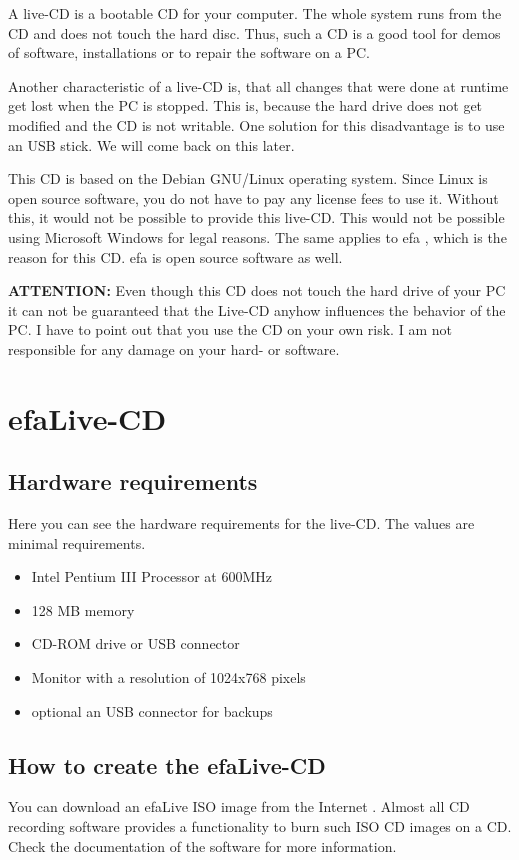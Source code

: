 \documentclass[a4paper,12pt,twoside]{article}
\begin{document}
A live-CD is a bootable CD for your computer. The whole system runs from
the CD and does not touch the hard disc. Thus, such a CD is a good tool
for demos of software, installations or to repair the software on a PC.

Another characteristic of a live-CD is, that all changes that were done
at runtime get lost when the PC is stopped. This is, because the hard
drive does not get modified and the CD is not writable. One solution
for this disadvantage is to use an USB stick. We will come back on this
later.

This CD is based on the Debian GNU/Linux \cite{DEB1} operating system.
Since Linux is open source software, you do not have to pay any license
fees to use it. Without this, it would not be possible to provide this
live-CD. This would not be possible using Microsoft Windows for legal
reasons. The same applies to efa \cite{EFA1}, which is the reason for
this CD. efa is open source software as well.

\bigskip
\textbf{ATTENTION:} Even though this CD does not touch the hard drive of your PC
it can not be guaranteed that the Live-CD anyhow influences the
behavior of the PC. I have to point out that you use the CD on your own
risk. I am not responsible for any damage on your hard- or software.
\bigskip

\section{efaLive-CD}
\label{sct:efalivecd}
\subsection{Hardware requirements}
\label{sct:live_hardware}
Here you can see the hardware requirements for the live-CD. The values
are minimal requirements.

\begin{itemize}
    \item Intel Pentium III Processor at 600MHz
    \item 128 MB memory
    \item CD-ROM drive or USB connector
    \item Monitor with a resolution of 1024x768 pixels
    \item optional an USB connector for backups
\end{itemize}

\subsection{How to create the efaLive-CD}
\label{sct:create_cd}
You can download an efaLive ISO image from the Internet \cite{EFA4}.
Almost all CD recording software provides a functionality to burn such
ISO CD images on a CD. Check the documentation of the software for more
information.
\end{document}
